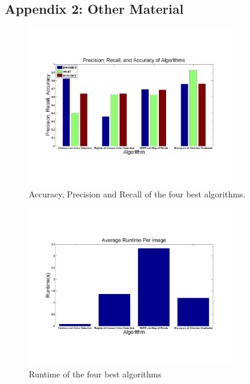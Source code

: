 \documentclass[letterpaper,10pt,titlepage]{article}
\begin{document}
\vspace*{\fill}
\begin{center}
\begin{minipage}{0.6\textwidth}
\section*{Appendix 2: Other Material}
\end{minipage}
\end{center}
\vfill

\newpage
\begin{figure}[H]
    \centering
    \includegraphics[width=0.8\textwidth]{alg_eval.pdf}
    \caption{Accuracy, Precision and Recall of the four best algorithms.}
\end{figure}

\begin{figure}[H]
    \centering
    \includegraphics[width=0.8\textwidth]{runtime.pdf}
    \caption{Runtime of the four best algorithms}
\end{figure}
\end{document}
